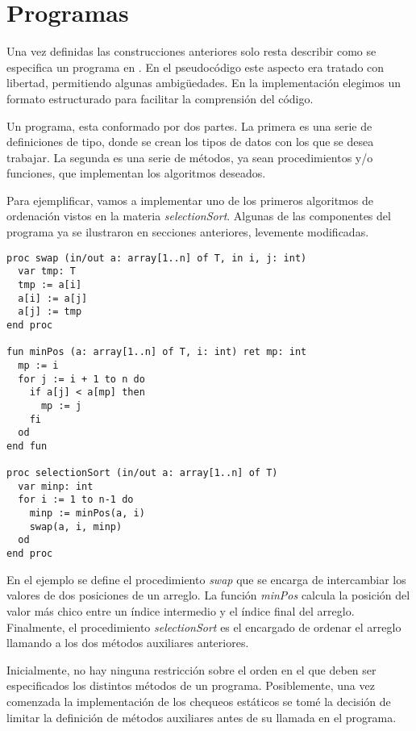 \documentclass{article}
\begin{document}
\section{Programas}

Una vez definidas las construcciones anteriores solo resta describir como se especifica un programa en \Lang.
En el pseudocódigo este aspecto era tratado con libertad, permitiendo algunas ambigüedades.
En la implementación elegimos un formato estructurado para facilitar la comprensión del código.

Un programa, esta conformado por dos partes.
La primera es una serie de definiciones de tipo, donde se crean los tipos de datos con los que se desea trabajar.
La segunda es una serie de métodos, ya sean procedimientos y/o funciones, que implementan los algoritmos deseados.

Para ejemplificar, vamos a implementar uno de los primeros algoritmos de ordenación vistos en la materia \textit{selectionSort}.
Algunas de las componentes del programa ya se ilustraron en secciones anteriores, levemente modificadas.
\begin{lstlisting}
proc swap (in/out a: array[1..n] of T, in i, j: int)
  var tmp: T
  tmp := a[i]
  a[i] := a[j]
  a[j] := tmp
end proc

fun minPos (a: array[1..n] of T, i: int) ret mp: int
  mp := i
  for j := i + 1 to n do
    if a[j] < a[mp] then
      mp := j
    fi
  od
end fun

proc selectionSort (in/out a: array[1..n] of T)
  var minp: int
  for i := 1 to n-1 do
    minp := minPos(a, i)
    swap(a, i, minp)
  od
end proc
\end{lstlisting}

En el ejemplo se define el procedimiento \textit{swap} que se encarga de intercambiar los valores de dos posiciones de un arreglo.
La función \textit{minPos} calcula la posición del valor más chico entre un índice intermedio y el índice final del arreglo.
Finalmente, el procedimiento \textit{selectionSort} es el encargado de ordenar el arreglo llamando a los dos métodos auxiliares anteriores.

Inicialmente, no hay ninguna restricción sobre el orden en el que deben ser especificados los distintos métodos de un programa.
Posiblemente, una vez comenzada la implementación de los chequeos estáticos se tomé la decisión de limitar la definición de métodos auxiliares antes de su llamada en el programa.
\end{document}
